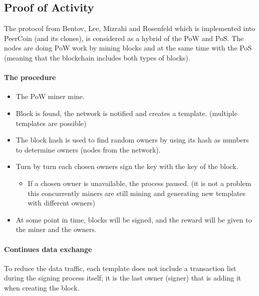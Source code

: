 

\subsection{Proof of Activity}
The protocol from Bentov, Lee, Mizrahi and Rosenfeld  \cite{Bentov2013ProofStake} which is implemented into PeerCoin (and its clones), is considered as a hybrid of the PoW and PoS. The nodes are doing PoW work by mining blocks and at the same time with the PoS (meaning that the blockchain includes both types of blocks).

\paragraph{The procedure}
\begin{itemize}
\item The PoW miner mine.
\item Block is found, the network is notified and creates a template. (multiple templates are possible)
\item The block hash is used to find random owners by using its hash as numbers to determine owners (nodes from the network).
\item Turn by turn each chosen owners sign the key with the key of the block.
\begin{itemize}
\item If a chosen owner is unavailable, the process paused. (it is not a problem this concurrently miners are still mining and generating new templates with different owners)
\end{itemize}
\item At some point in time, blocks will be signed, and the reward will be given to the miner and the owners.
\end{itemize}

\paragraph{Continues data exchange}
To reduce the data traffic, each template does not include a transaction list during the signing process itself; it is the last owner (signer) that is adding it when creating the block.

